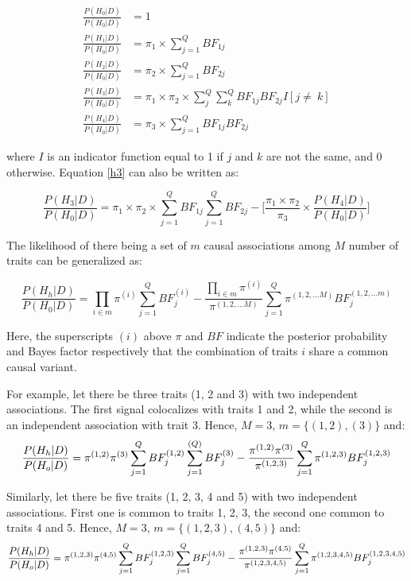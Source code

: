 \documentclass{article}
\begin{document}
\begin{align}
\frac{P(H_0|D)}{P(H_0|D)} & = 1 \\
\frac{P(H_1|D)}{P(H_0|D)} & = \pi_1 \times \sum_{j=1}^Q BF_{1j} \\
\frac{P(H_2|D)}{P(H_0|D)} & = \pi_2 \times \sum_{j=1}^Q BF_{2j} \\
\label{h3}
\frac{P(H_3|D)}{P(H_0|D)} & = \pi_1 \times \pi_2 \times \sum_{j}^Q \sum_{k}^Q BF_{1j} BF_{2j} I[j \ne\ k] \\
\frac{P(H_4|D)}{P(H_0|D)} & = \pi_{3} \times \sum_{j=1}^Q BF_{1j} BF_{2j}
\end{align}

\noindent where $I$ is an indicator function equal to 1 if $j$ and $k$ are not the same, and 0 otherwise. Equation \ref{h3} can also be written as:

\begin{equation}
\frac{P(H_3|D)}{P(H_0|D)} = \pi_1 \times \pi_2 \times \sum_{j=1}^Q BF_{1j} \sum_{j=1}^Q BF_{2j} - \bigg[\frac{\pi_1 \times \pi_2}{\pi_3} \times \frac{P(H_4|D)}{P(H_0|D)} \bigg]
\end{equation}

\noindent The likelihood of there being a set of $m$ causal associations among $M$ number of traits can be generalized as:

\begin{equation}
\frac{P(H_h|D)}{P(H_0|D)} = \prod_{i \in m} \pi^{(i)} \sum_{j=1}^Q BF_j^{(i)} - \frac{\prod_{i \in m} \pi^{(i)}}{\pi^{(1,2,...M)}} \sum_{j=1}^Q \pi^{(1,2,...M)} BF_j^{(1,2,...m)}
\end{equation}

\noindent Here, the superscripts $(i)$ above $\pi$ and $BF$ indicate the posterior probability and Bayes factor respectively that the combination of traits $i$ share a common causal variant.

For example, let there be three traits (1, 2 and 3) with two independent associations. The first signal colocalizes with traits 1 and 2, while the second is an independent association with trait 3. Hence, $M = 3$, $m = \big\{(1,2),(3)\big\}$ and:
\begin{equation}
\frac{P(H_h|D)}{P(H_o|D)} = \pi^{(1,2)} \pi^{(3)} \sum_{j=1}^{Q} BF_j^{(1,2)} \sum_{j=1}^{(Q)} BF_j^{(3)} - \frac{\pi^{(1,2)} \pi^{(3)}}{\pi^{(1,2,3)}} \sum_{j=1}^Q \pi^{(1,2,3)} BF_j^{(1,2,3)}\\
\end{equation}

\noindent Similarly, let there be five traits (1, 2, 3, 4 and 5) with two independent associations. First one is common to traits 1, 2, 3, the second one common to traits 4 and 5. Hence, $M = 3$, $m = \big\{(1,2,3),(4,5)\}$ and:
\begin{equation}
\frac{P(H_h|D)}{P(H_o|D)} = \pi^{(1,2,3)} \pi^{(4,5)} \sum_{j=1}^{Q} BF_j^{(1,2,3)} \sum_{j=1}^{Q} BF_j^{(4,5)} - \frac{\pi^{(1,2,3)} \pi^{(4,5)} }{\pi^{(1,2,3,4,5)}} \sum_{j=1}^Q \pi^{(1,2,3,4,5)} BF_j^{(1,2,3,4,5)}\\
\end{equation}
\end{document}

